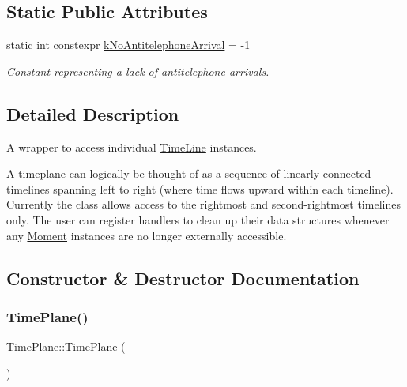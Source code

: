 \subsection*{Static Public Attributes}
\begin{DoxyCompactItemize}
\item 
\mbox{\label{classtimeplane_1_1_time_plane_afe378e5e76ef261c9fc9c2637157c75e}} 
static int constexpr \hyperlink{classtimeplane_1_1_time_plane_afe378e5e76ef261c9fc9c2637157c75e}{k\+No\+Antitelephone\+Arrival} = -\/1
\begin{DoxyCompactList}\small\item\em Constant representing a lack of antitelephone arrivals. \end{DoxyCompactList}\end{DoxyCompactItemize}


\subsection{Detailed Description}
A wrapper to access individual {\ttfamily \hyperlink{classtimeplane_1_1_time_line}{Time\+Line}} instances. 

A timeplane can logically be thought of as a sequence of linearly connected timelines spanning left to right (where time flows upward within each timeline). Currently the class allows access to the rightmost and second-\/rightmost timelines only. The user can register handlers to clean up their data structures whenever any {\ttfamily \hyperlink{classtimeplane_1_1_moment}{Moment}} instances are no longer externally accessible. 

\subsection{Constructor \& Destructor Documentation}
\mbox{\label{classtimeplane_1_1_time_plane_a8d8f1227ade6490fa8b814f1b7f18ecc}} 
\subsubsection{\texorpdfstring{Time\+Plane()}{TimePlane()}}
{\footnotesize\ttfamily Time\+Plane\+::\+Time\+Plane (\begin{DoxyParamCaption}{ }\end{DoxyParamCaption})}




